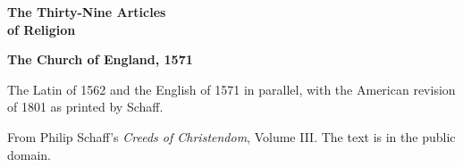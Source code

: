 \documentclass[11pt,letterpaper]{article}
\begin{document}
\color{ink}

\begin{titlepage}
\centering
\vspace*{4em}
{\LARGE\bfseries\color{heading} The Thirty-Nine Articles\\[0.3em]of Religion\par}
\vspace{2em}
{\Large\bfseries\color{heading} The Church of England, 1571\par}
\vspace{2.5em}
{\itshape\color{subhead}\parbox{0.8\linewidth}{\centering The Latin of 1562 and the English of 1571 in parallel, with the American revision of 1801 as printed by Schaff.\par}}
\vfill
{\small From Philip Schaff's \emph{Creeds of Christendom}, Volume III. The text is in the public domain.\par}
\vspace{2em}
\end{titlepage}

\tableofcontents


\end{document}
